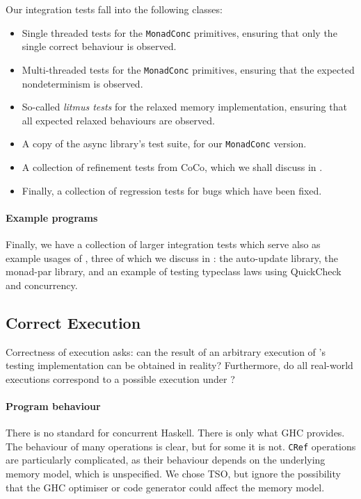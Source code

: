 Our integration tests fall into the following classes:

\begin{itemize}
\item Single threaded tests for the \verb|MonadConc| primitives,
  ensuring that only the single correct behaviour is observed.
\item Multi-threaded tests for the \verb|MonadConc| primitives,
  ensuring that the expected nondeterminism is observed.
\item So-called \emph{litmus tests} for the relaxed memory
  implementation, ensuring that all expected relaxed behaviours are
  observed.
\item A copy of the async library's\cite{async} test suite, for our
  \verb|MonadConc| version.
\item A collection of refinement tests from CoCo, which we shall
  discuss in .
\item Finally, a collection of regression tests for bugs which have
  been fixed.
\end{itemize}

\paragraph{Example programs}
Finally, we have a collection of larger integration tests which serve
also as example usages of \dejafu{}, three of which we discuss in
: the auto-update
library\cite{auto_update}, the monad-par
library\cite{monad_par,marlow2011}, and an example of testing
typeclass laws using QuickCheck\cite{claessen2000} and concurrency.

\subsection{Correct Execution}

Correctness of execution asks: can the result of an arbitrary
execution of \dejafu{}'s testing implementation can be obtained in
reality?  Furthermore, do all real-world executions correspond to a
possible execution under \dejafu{}?

\paragraph{Program behaviour}
There is no standard for concurrent Haskell.  There is only what GHC
provides.  The behaviour of many operations is clear, but for some it
is not.  \verb|CRef| operations are particularly complicated, as their
behaviour depends on the underlying memory model, which is
unspecified.  We chose TSO, but ignore the possibility that the GHC
optimiser or code generator could affect the memory model.


